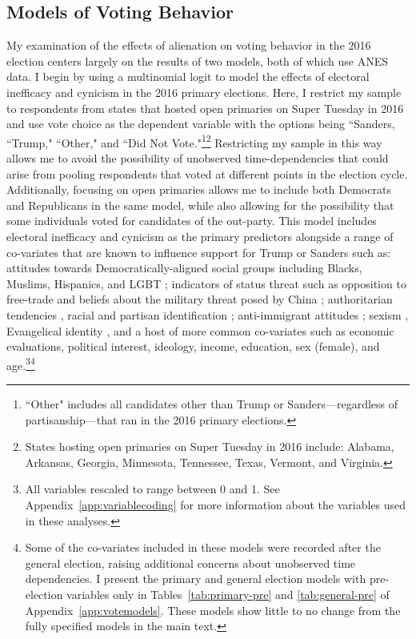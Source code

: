 \documentclass[12pt]{article}
\begin{document}
\subsection{Models of Voting Behavior}
My examination of the effects of alienation on voting behavior in the 2016 election centers largely on the results of two models, both of which use ANES data. I begin by using a multinomial logit to model the effects of electoral inefficacy and cynicism in the 2016 primary elections. Here, I restrict my sample to respondents from states that hosted open primaries on Super Tuesday in 2016 and use vote choice as the dependent variable with the options being ``Sanders, ``Trump," ``Other," and ``Did Not Vote."\footnote{``Other" includes all candidates other than Trump or Sanders---regardless of partisanship---that ran in the 2016 primary elections.}\footnote{States hosting open primaries on Super Tuesday in 2016 include: Alabama, Arkansas, Georgia, Minnesota, Tennessee, Texas, Vermont, and Virginia.} Restricting my sample in this way allows me to avoid the possibility of unobserved time-dependencies that could arise from pooling respondents that voted at different points in the election cycle. Additionally, focusing on open primaries allows me to include both Democrats and Republicans in the same model, while also allowing for the possibility that some individuals voted for candidates of the out-party. This model includes electoral inefficacy and cynicism as the primary predictors alongside a range of co-variates that are known to influence support for Trump or Sanders such as: attitudes towards Democratically-aligned social groups including Blacks, Muslims, Hispanics, and LGBT \parencite{mason2021activating,hopkins2021activation}; indicators of status threat such as opposition to free-trade and beliefs about the military threat posed by China \parencite{mutz2018status}; authoritarian tendencies \parencite{knuckey2020authoritarianism}, racial and partisan identification \parencite{sides2018identity}; anti-immigrant attitudes \parencite{sides2018identity,hooghe2018explaining}; sexism \parencite{valentino2018mobilizing,sides2018identity}, Evangelical identity \parencite{margolis2020wants}, and a host of more common co-variates such as economic evaluations, political interest, ideology, income, education, sex (female), and age.\footnote{All variables rescaled to range between 0 and 1. See Appendix~\ref{app:variablecoding} for more information about the variables used in these analyses.}\footnote{Some of the co-variates included in these models were recorded after the general election, raising additional concerns about unobserved time dependencies. I present the primary and general election models with pre-election variables only in Tables~\ref{tab:primary-pre} and \ref{tab:general-pre} of Appendix~\ref{app:votemodels}. These models show little to no change from the fully specified models in the main text.}
\end{document}
